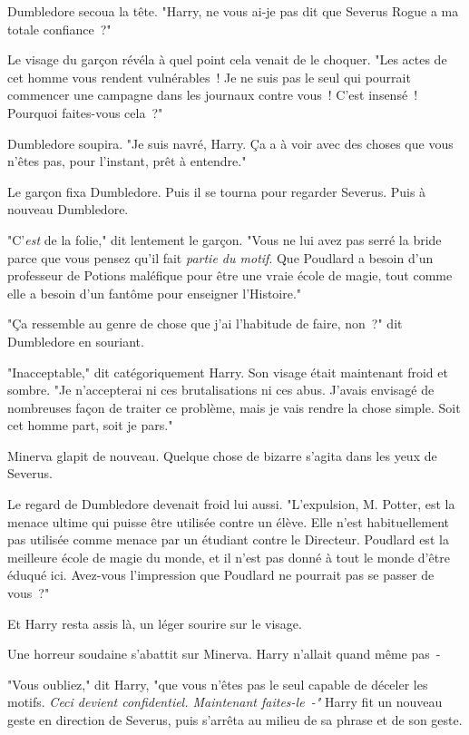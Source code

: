 Dumbledore secoua la tête. "Harry, ne vous ai-je pas dit que Severus Rogue a ma totale confiance~?"

Le visage du garçon révéla à quel point cela venait de le choquer. "Les actes de cet homme vous rendent vulnérables~! Je ne suis pas le seul qui pourrait commencer une campagne dans les journaux contre vous~! C'est insensé~! Pourquoi faites-vous cela~?"

Dumbledore soupira. "Je suis navré, Harry. Ça a à voir avec des choses que vous n'êtes pas, pour l'instant, prêt à entendre."

Le garçon fixa Dumbledore. Puis il se tourna pour regarder Severus. Puis à nouveau Dumbledore.

"C'\emph{est} de la folie," dit lentement le garçon. "Vous ne lui avez pas serré la bride parce que vous pensez qu'il fait \emph{partie du motif}. Que Poudlard a besoin d'un professeur de Potions maléfique pour être une vraie école de magie, tout comme elle a besoin d'un fantôme pour enseigner l'Histoire."

"Ça ressemble au genre de chose que j'ai l'habitude de faire, non~?" dit Dumbledore en souriant.

"Inacceptable," dit catégoriquement Harry. Son visage était maintenant froid et sombre. "Je n'accepterai ni ces brutalisations ni ces abus. J'avais envisagé de nombreuses façon de traiter ce problème, mais je vais rendre la chose simple. Soit cet homme part, soit je pars."

Minerva glapit de nouveau. Quelque chose de bizarre s'agita dans les yeux de Severus.

Le regard de Dumbledore devenait froid lui aussi. "L'expulsion, M. Potter, est la menace ultime qui puisse être utilisée contre un élève. Elle n'est habituellement pas utilisée comme menace par un étudiant contre le Directeur. Poudlard est la meilleure école de magie du monde, et il n'est pas donné à tout le monde d'être éduqué ici. Avez-vous l'impression que Poudlard ne pourrait pas se passer de vous~?"

Et Harry resta assis là, un léger sourire sur le visage.

Une horreur soudaine s'abattit sur Minerva. Harry n'allait quand même pas~-

"Vous oubliez," dit Harry, "que vous n'êtes pas le seul capable de déceler les motifs. \emph{Ceci devient confidentiel. Maintenant faites-le~-"} Harry fit un nouveau geste en direction de Severus, puis s'arrêta au milieu de sa phrase et de son geste.

